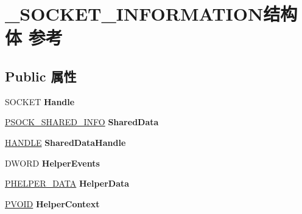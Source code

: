 \hypertarget{struct___s_o_c_k_e_t___i_n_f_o_r_m_a_t_i_o_n}{}\section{\+\_\+\+S\+O\+C\+K\+E\+T\+\_\+\+I\+N\+F\+O\+R\+M\+A\+T\+I\+O\+N结构体 参考}
\label{struct___s_o_c_k_e_t___i_n_f_o_r_m_a_t_i_o_n}
\subsection*{Public 属性}
\begin{DoxyCompactItemize}
\item 
\mbox{\label{struct___s_o_c_k_e_t___i_n_f_o_r_m_a_t_i_o_n_acf9bb1650d33edf7788d102d200fb25f}} 
S\+O\+C\+K\+ET {\bfseries Handle}
\item 
\mbox{\label{struct___s_o_c_k_e_t___i_n_f_o_r_m_a_t_i_o_n_ab151bffc3b1b6637db166bfd58e4fedf}} 
\hyperlink{struct___s_o_c_k___s_h_a_r_e_d___i_n_f_o}{P\+S\+O\+C\+K\+\_\+\+S\+H\+A\+R\+E\+D\+\_\+\+I\+N\+FO} {\bfseries Shared\+Data}
\item 
\mbox{\label{struct___s_o_c_k_e_t___i_n_f_o_r_m_a_t_i_o_n_a4e5c61463aabd0d5e17b73d2185ae7dc}} 
\hyperlink{interfacevoid}{H\+A\+N\+D\+LE} {\bfseries Shared\+Data\+Handle}
\item 
\mbox{\label{struct___s_o_c_k_e_t___i_n_f_o_r_m_a_t_i_o_n_aeb071e28cc690e75277e14a56e386c24}} 
D\+W\+O\+RD {\bfseries Helper\+Events}
\item 
\mbox{\label{struct___s_o_c_k_e_t___i_n_f_o_r_m_a_t_i_o_n_abc6a4504b1ffb781a7b1d5f58052fb38}} 
\hyperlink{struct___h_e_l_p_e_r___d_a_t_a}{P\+H\+E\+L\+P\+E\+R\+\_\+\+D\+A\+TA} {\bfseries Helper\+Data}
\item 
\mbox{\label{struct___s_o_c_k_e_t___i_n_f_o_r_m_a_t_i_o_n_a081c2be3a43ceb2ff21ab4e284354c05}} 
\hyperlink{interfacevoid}{P\+V\+O\+ID} {\bfseries Helper\+Context}

\end{DoxyCompactItemize}

